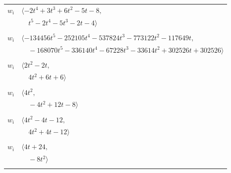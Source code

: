 \documentclass[11pt]{article}
\begin{document}
\begin{longtable}{@{}ll@{}}
$w_i$ & $\langle -2t^{4}+3t^{3}+6t^{2}-5t-8,$\\
 & $\quad t^{5}-2t^{4}-5t^{3}-2t-4\rangle$\\
\addlinespace[2pt]
\multicolumn{2}{@{}p{0.97\textwidth}@{}}{$i=2$, $D_i=16807$, $\rho_{ij}$: $1{:}1, \allowbreak 4{:}2, \allowbreak 5{:}1, \allowbreak 6{:}2, \allowbreak 16{:}2, \allowbreak 17{:}1, \allowbreak 18{:}1, \allowbreak 21{:}2, \allowbreak 22{:}1, \allowbreak 28{:}2, \allowbreak 31{:}2, \allowbreak 32{:}1$}\\
$w_i$ & $\langle -134456t^{5}-252105t^{4}-537824t^{3}-773122t^{2}-117649t,$\\
 & $\quad -168070t^{5}-336140t^{4}-67228t^{3}-33614t^{2}+302526t+302526\rangle$\\
\addlinespace[2pt]
\multicolumn{2}{@{}p{0.97\textwidth}@{}}{$i=3$, $D_i=1$, $\rho_{ij}$: $11{:}1, \allowbreak 14{:}1, \allowbreak 15{:}2, \allowbreak 25{:}1, \allowbreak 26{:}2, \allowbreak 28{:}2, \allowbreak 32{:}1, \allowbreak 35{:}1$}\\
$w_i$ & $\langle 2t^{2}-2t,$\\
 & $\quad 4t^{2}+6t+6\rangle$\\
\addlinespace[2pt]
\multicolumn{2}{@{}p{0.97\textwidth}@{}}{$i=4$, $D_i=1$, $\rho_{ij}$: $0{:}2, \allowbreak 2{:}1, \allowbreak 9{:}1, \allowbreak 11{:}1, \allowbreak 12{:}1, \allowbreak 13{:}2, \allowbreak 15{:}1, \allowbreak 17{:}2, \allowbreak 18{:}1, \allowbreak 20{:}1, \allowbreak 22{:}1, \allowbreak 27{:}1$}\\
$w_i$ & $\langle 4t^{2},$\\
 & $\quad -4t^{2}+12t-8\rangle$\\
\addlinespace[2pt]
\multicolumn{2}{@{}p{0.97\textwidth}@{}}{$i=5$, $D_i=1$, $\rho_{ij}$: $1{:}1, \allowbreak 2{:}2, \allowbreak 7{:}1, \allowbreak 10{:}1, \allowbreak 11{:}2, \allowbreak 14{:}1, \allowbreak 15{:}2, \allowbreak 24{:}2, \allowbreak 25{:}1, \allowbreak 31{:}2, \allowbreak 33{:}2$}\\
$w_i$ & $\langle 4t^{2}-4t-12,$\\
 & $\quad 4t^{2}+4t-12\rangle$\\
\addlinespace[2pt]
\multicolumn{2}{@{}p{0.97\textwidth}@{}}{$i=6$, $D_i=1$, $\rho_{ij}$: $2{:}1, \allowbreak 7{:}1, \allowbreak 12{:}2, \allowbreak 14{:}1, \allowbreak 24{:}2, \allowbreak 25{:}2, \allowbreak 31{:}2, \allowbreak 35{:}2$}\\
$w_i$ & $\langle 4t+24,$\\
 & $\quad -8t^{2}\rangle$\\
\addlinespace[2pt]

\end{longtable}
\end{document}
